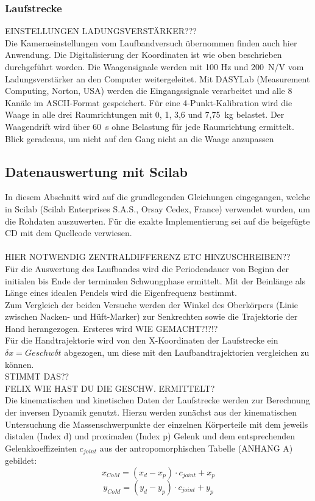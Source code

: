 \subsubsection{Laufstrecke}
EINSTELLUNGEN LADUNGSVERSTÄRKER???\\
Die Kameraeinstellungen vom Laufbandversuch übernommen finden auch hier Anwendung. Die Digitalisierung der Koordinaten ist wie oben beschrieben durchgeführt worden. Die Waagensignale werden mit 100 Hz und 200~N/V vom Ladungsverstärker an den Computer weitergeleitet. Mit DASYLab (Measurement Computing, Norton, USA) werden die Eingangssignale verarbeitet und alle 8 Kanäle im ASCII-Format gespeichert.
Für eine 4-Punkt-Kalibration wird die Waage in alle drei Raumrichtungen mit 0, 1, 3,6 und 7,75~kg belastet. Der Waagendrift wird über 60~s ohne Belastung für jede Raumrichtung ermittelt.\\
Blick geradeaus, um nicht auf den Gang nicht an die Waage anzupassen


\subsection{Datenauswertung mit Scilab}
In diesem Abschnitt wird auf die grundlegenden Gleichungen eingegangen, welche in Scilab (Scilab Enterprises S.A.S., Orsay Cedex, France) verwendet wurden, um die Rohdaten auszuwerten. Für die exakte Implementierung sei auf die beigefügte CD mit dem Quellcode verwiesen.\\
\\
HIER NOTWENDIG ZENTRALDIFFERENZ ETC HINZUSCHREIBEN??\\

Für die Auswertung des Laufbandes wird die Periodendauer von Beginn der initialen bis Ende der terminalen Schwungphase ermittelt. Mit der Beinlänge als Länge eines idealen Pendels wird die Eigenfrequenz bestimmt.\\
Zum Vergleich der beiden Versuche werden der Winkel des Oberkörpers (Linie zwischen Nacken- und Hüft-Marker) zur Senkrechten sowie die Trajektorie der Hand herangezogen. Ersteres wird WIE GEMACHT?!?!?\\
Für die Handtrajektorie wird von den X-Koordinaten der Laufstrecke ein $\delta x = Geschw \delta t$ abgezogen, um diese mit den Laufbandtrajektorien vergleichen zu können.\\
STIMMT DAS??\\
FELIX WIE HAST DU DIE GESCHW. ERMITTELT?\\

Die kinematischen und kinetischen Daten der Laufstrecke werden zur Berechnung der inversen Dynamik genutzt. Hierzu werden zunächst aus der kinematischen Untersuchung die Massenschwerpunkte der einzelnen Körperteile mit dem jeweils distalen (Index d) und proximalen (Index p) Gelenk und dem entsprechenden Gelenkkoeffizeinten $c_{joint}$ aus der antropomorphischen Tabelle (ANHANG A) gebildet:
\begin{equation}
x_{CoM} = (x_d - x_p) \cdot c_{joint} + x_p
\label{eq:CoM_x}
\end{equation}
\begin{equation}
y_{CoM} = (y_d - y_p) \cdot c_{joint} + y_p
\label{eq:CoM_y}
\end{equation}

